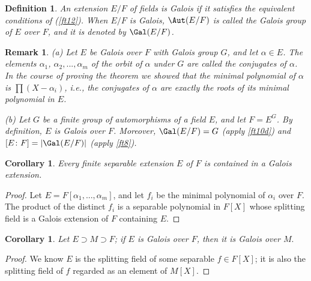 \documentclass[a4paper,11pt,final,openany]{memoir}
\newtheorem{corollary}[X]{Corollary}
\newtheorem{definition}[X]{Definition}
\newtheorem{remark}[X]{Remark}
\theoremstyle{nonumberplain}
\newtheorem{proof}{Proof.}
\begin{document}
\begin{definition}
\label{ft11m}An extension $E/F$ of fields is \emph{Galois}%
if it satisfies the equivalent conditions of (\ref{ft12}). When $E/F$ is
Galois, $\Aut(E/F)$ is called the \emph{Galois group }%
of $E$ over $F$, and it is denoted by $\Gal(E/F)$.
\end{definition}

\begin{remark}
\label{ft13}(a) Let $E$ be Galois over $F$ with Galois group $G$, and let
$\alpha\in E$. The elements $\alpha_{1}$, $\alpha_{2},...,\alpha_{m}$ of the
orbit of $\alpha$ under $G$ are called the \emph{conjugates\/}%
of $\alpha$. In the course of proving the theorem we showed that the minimal
polynomial of $\alpha$ is $\prod(X-\alpha_{i})$, i.e., the conjugates of
$\alpha$ are exactly the roots of its minimal polynomial in $E$.

(b) Let $G$ be a finite group of automorphisms of a field $E$, and let
$F=E^{G}$. By definition, $E$ is Galois over $F$. Moreover, $\Gal(E/F)=G$
(apply \ref{ft10d}) and $[E\colon F]=|\Gal(E/F)|$ (apply \ref{ft8}).
\end{remark}

\begin{corollary}
\label{ft14}Every finite separable extension $E$ of $F$ is contained in a
Galois extension.
\end{corollary}

\begin{proof}
Let $E=F[\alpha_{1},...,\alpha_{m}]$, and let $f_{i}$ be the minimal
polynomial of $\alpha_{i}$ over $F$. The product of the distinct $f_{i}$ is a
separable polynomial in $F[X]$ whose splitting field is a Galois extension of
$F$ containing $E$.
\end{proof}

\begin{corollary}
\label{ft15}Let $E\supset M\supset F$; if $E$ is Galois over $F$, then it is
Galois over $M.$
\end{corollary}

\begin{proof}
We know $E$ is the splitting field of some separable $f\in F[X]$; it is also
the splitting field of $f$ regarded as an element of $M[X].$
\end{proof}
\end{document}
